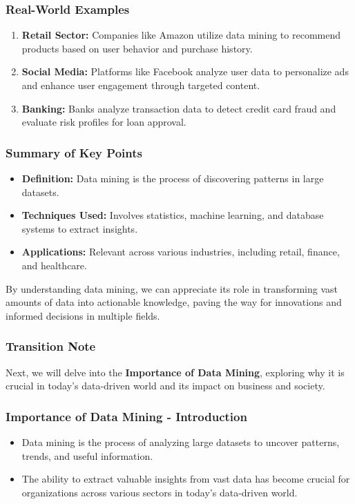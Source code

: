 \documentclass{beamer}
\begin{document}
\begin{frame}[fragile]
    \frametitle{Real-World Examples}
    \begin{enumerate}
        \item \textbf{Retail Sector:} Companies like Amazon utilize data mining to recommend products based on user behavior and purchase history.
        \item \textbf{Social Media:} Platforms like Facebook analyze user data to personalize ads and enhance user engagement through targeted content.
        \item \textbf{Banking:} Banks analyze transaction data to detect credit card fraud and evaluate risk profiles for loan approval.
    \end{enumerate}
\end{frame}

\begin{frame}[fragile]
    \frametitle{Summary of Key Points}
    \begin{itemize}
        \item \textbf{Definition:} Data mining is the process of discovering patterns in large datasets.
        \item \textbf{Techniques Used:} Involves statistics, machine learning, and database systems to extract insights.
        \item \textbf{Applications:} Relevant across various industries, including retail, finance, and healthcare.
    \end{itemize}

    By understanding data mining, we can appreciate its role in transforming vast amounts of data into actionable knowledge, paving the way for innovations and informed decisions in multiple fields.
\end{frame}

\begin{frame}[fragile]
    \frametitle{Transition Note}
    Next, we will delve into the \textbf{Importance of Data Mining}, exploring why it is crucial in today's data-driven world and its impact on business and society.
\end{frame}

\begin{frame}[fragile]
    \frametitle{Importance of Data Mining - Introduction}
    \begin{itemize}
        \item Data mining is the process of analyzing large datasets to uncover patterns, trends, and useful information.
        \item The ability to extract valuable insights from vast data has become crucial for organizations across various sectors in today's data-driven world.
    \end{itemize}
\end{frame}
\end{document}
